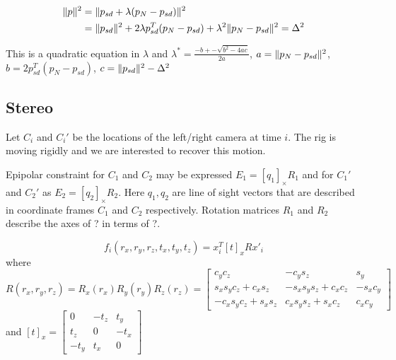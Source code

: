\documentclass[10pt]{article}         %
\DeclarePairedDelimiter\norm{\lVert}{\rVert}%
\begin{document}
\begin{align*}
  \norm{p}^2 &= \norm{p_{sd}+\lambda(p_N-p_{sd})}^2\\
  &= \norm{p_{sd}}^2 +2\lambda p_{sd}^T(p_N-p_{sd})+\lambda^2\norm{p_N-p_{sd}}^2 = \Delta^2
\end{align*}

This is a quadratic equation in $\lambda$ and $\lambda^* =
\frac{-b+-\sqrt{b^2-4ac}}{2a}$, $a=\norm{p_N-p_{sd}}^2$, $b=2p_{sd}^T(p_N-p_{sd})$, $c= \norm{p_{sd}}^2-\Delta^2$


\subsection{Stereo}
Let $C_i$ and $C_i'$ be the locations of the left/right camera at time
$i$. The rig is moving rigidly and we are interested to recover this
motion.

Epipolar constraint for $C_1$ and $C_2$ may be expressed $E_1 =
[q_1]_{\times}R_1$ and for $C_1'$ and $C_2'$ as $E_2 =
[q_2]_{\times}R_2$.  Here $q_1,q_2$ are line of sight vectors that are
described in coordinate frames $C_1$ and $C_2$ respectively. Rotation
matrices $R_1$ and $R_2$ describe the axes of ? in terms of ?.



\[
f_i(r_x,r_y,r_z,t_x,t_y,t_z) = x_i^T[t]_xRx'_i
\]
where
\[
R(r_x,r_y,r_z)=R_x(r_x)R_y(r_y)R_z(r_z)=
\begin{bmatrix}
  c_yc_z & -c_ys_z &s_y\\
  s_xs_yc_z+c_xs_z &-s_xs_ys_z+c_xc_z &-s_xc_y\\
  -c_xs_yc_z+s_xs_z &c_xs_ys_z+s_xc_z &c_xc_y
\end{bmatrix}
\] 
and
$[t]_x=\begin{bmatrix}0 &-t_z &t_y\\t_z &0 &-t_x\\-t_y &t_x
  &0\end{bmatrix}$
\end{document}
